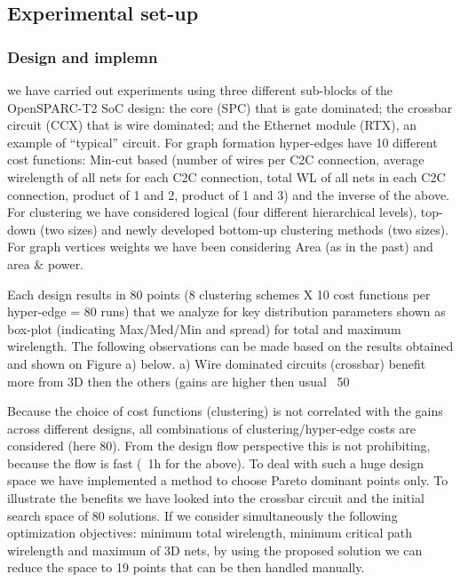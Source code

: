 \subsection{Experimental set-up}
\subsubsection{Design and implemn}
we have carried out experiments using three different sub-blocks of the OpenSPARC-T2 SoC design: the core (SPC) that is gate dominated; the crossbar circuit (CCX) that is wire dominated; and the Ethernet module (RTX), an example of “typical” circuit. For graph formation hyper-edges have 10 different cost functions: Min-cut based (number of wires per C2C connection, average wirelength of all nets for each C2C connection, total WL of all nets in each C2C connection, product of 1 and 2, product of 1 and 3) and the inverse of the above. For clustering we have considered logical (four different hierarchical levels), top-down (two sizes) and newly developed bottom-up clustering methods (two sizes). For graph vertices weights we have been considering Area (as in the past) and area \& power.

Each design results in 80 points (8 clustering schemes X 10 cost functions per hyper-edge = 80 runs) that we analyze for key distribution parameters shown as box-plot (indicating Max/Med/Min and spread) for total and maximum wirelength. The following observations can be made based on the results obtained and shown on Figure a) below. a) Wire dominated circuits (crossbar) benefit more from 3D then the others (gains are higher then usual ~50%
 
Because the choice of cost functions (clustering) is not correlated with the gains across different designs, all combinations of clustering/hyper-edge costs are considered (here 80). From the design flow perspective this is not prohibiting, because the flow is fast (~1h for the above). To deal with such a huge design space we have implemented a method to choose Pareto dominant points only. To illustrate the benefits we have looked into the crossbar circuit and the initial search space of 80 solutions. If we consider simultaneously the following optimization objectives: minimum total wirelength, minimum critical path wirelength and maximum of 3D nets, by using the proposed solution we can reduce the space to 19 points that can be then handled manually. 

